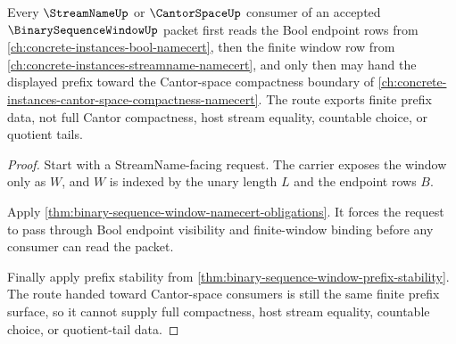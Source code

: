 \begin{theorem}
\label{thm:binary-sequence-window-streamname-route}
Every $\StreamNameUp$ or $\CantorSpaceUp$ consumer of an accepted $\BinarySequenceWindowUp$ packet first reads the Bool endpoint rows from \autoref{ch:concrete-instances-bool-namecert}, then the finite window row from \autoref{ch:concrete-instances-streamname-namecert}, and only then may hand the displayed prefix toward the Cantor-space compactness boundary of \autoref{ch:concrete-instances-cantor-space-compactness-namecert}. The route exports finite prefix data, not full Cantor compactness, host stream equality, countable choice, or quotient tails.
\end{theorem}
\begin{proof}
Start with a StreamName-facing request. The carrier exposes the window only as $W$, and $W$ is indexed by the unary length $L$ and the endpoint rows $B$.

Apply \autoref{thm:binary-sequence-window-namecert-obligations}. It forces the request to pass through Bool endpoint visibility and finite-window binding before any consumer can read the packet.

Finally apply prefix stability from \autoref{thm:binary-sequence-window-prefix-stability}. The route handed toward Cantor-space consumers is still the same finite prefix surface, so it cannot supply full compactness, host stream equality, countable choice, or quotient-tail data.
\end{proof}





